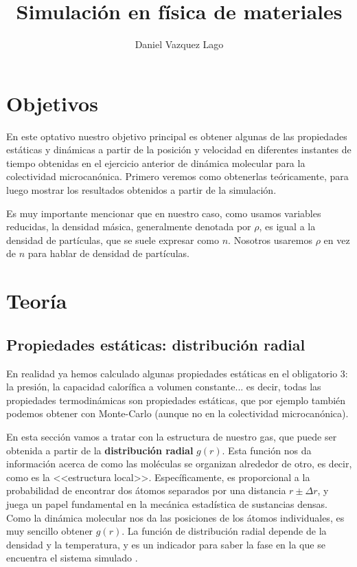 \documentclass[11pt]{article} %
\author{Daniel Vazquez Lago}
\title{Simulación en física de materiales}
\begin{document}
	
	
\maketitle
\newpage
\tableofcontents
	
\setlength{\parskip}{1.5mm} %
	
\section{Objetivos}	

En este optativo nuestro objetivo principal es obtener algunas de las propiedades estáticas y dinámicas a partir de la posición y velocidad en diferentes instantes de tiempo obtenidas en el ejercicio anterior de dinámica molecular para la colectividad microcanónica. Primero veremos como obtenerlas teóricamente, para luego mostrar los resultados obtenidos a partir de la simulación. 

Es muy importante mencionar que en nuestro caso, como usamos variables reducidas, la densidad másica, generalmente denotada por $\rho$, es igual a la densidad de partículas, que se suele expresar como $n$. Nosotros usaremos $\rho$ en vez de $n$ para hablar de densidad de partículas.

\section{Teoría}

\subsection{Propiedades estáticas: distribución radial}

En realidad ya hemos calculado algunas propiedades estáticas en el obligatorio 3: la presión, la capacidad calorífica a volumen constante... es decir, todas las propiedades termodinámicas son propiedades estáticas, que por ejemplo también podemos obtener con Monte-Carlo (aunque no en la colectividad microcanónica). 

En esta sección vamos a tratar con la estructura de nuestro gas, que puede ser obtenida a partir de la \textbf{distribución radial} $g(r)$. Esta función nos da información acerca de como las moléculas se organizan alrededor de otro, es decir, como es la <<estructura local>>. Específicamente, es proporcional a la probabilidad de encontrar dos átomos separados por una distancia $r\pm \Delta r$, y juega un papel fundamental en la mecánica estadística de sustancias densas. Como la dinámica molecular nos da las posiciones de los átomos individuales, es muy sencillo obtener $g(r)$. La función de distribución radial depende de la densidad y la temperatura, y es un indicador para saber la fase en la que se encuentra el sistema simulado \cite{Haile}.
\end{document}
